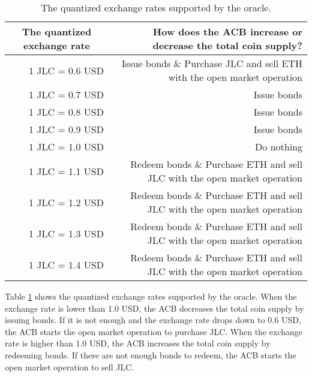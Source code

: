 \documentclass[dvipdfmx,a4paper]{article}
\begin{document}
\begin{table}[htb]
\begin{center}
\caption{The quantized exchange rates supported by the oracle.}\vspace{2ex}
\begin{tabular}{rr}\hline
\multicolumn{1}{c}{The quantized exchange rate} & How does the ACB increase or decrease the total coin supply?\\\hline
1 JLC = 0.6 USD & Issue bonds \& Purchase JLC and sell ETH with the open market operation\\
1 JLC = 0.7 USD & Issue bonds\\
1 JLC = 0.8 USD & Issue bonds\\
1 JLC = 0.9 USD & Issue bonds\\
1 JLC = 1.0 USD & Do nothing\\
1 JLC = 1.1 USD & Redeem bonds \& Purchase ETH and sell JLC with the open market operation\\
1 JLC = 1.2 USD & Redeem bonds \& Purchase ETH and sell JLC with the open market operation\\
1 JLC = 1.3 USD & Redeem bonds \& Purchase ETH and sell JLC with the open market operation\\
1 JLC = 1.4 USD & Redeem bonds \& Purchase ETH and sell JLC with the open market operation\\\hline
\end{tabular}
\label{table1}
\end{center}
\end{table}

Table \ref{table1} shows the quantized exchange rates supported by the oracle. When the exchange rate is lower than 1.0 USD, the ACB decreases the total coin supply by issuing bonds. If it is not enough and the exchange rate drops down to 0.6 USD, the ACB starts the open market operation to purchase JLC. When the exchange rate is higher than 1.0 USD, the ACB increases the total coin supply by redeeming bonds. If there are not enough bonds to redeem, the ACB starts the open market operation to sell JLC.
\end{document}

